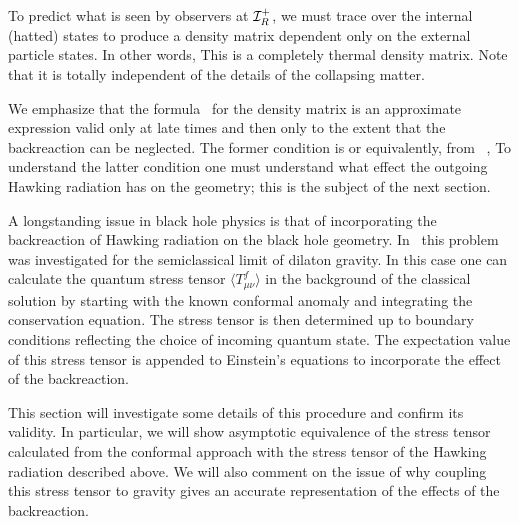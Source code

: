 To predict what is seen by observers at ${\cal I}_R^+$, we must trace over
the internal (hatted) states to produce a density matrix dependent only on
the external
particle states. In other words,
%
\eqn{}
%
This is a completely thermal density matrix.  Note that it is totally
independent of the details of the collapsing matter.

We emphasize that the formula \weig\ for the density matrix is an
approximate expression valid only at late times and then only to the extent
that the backreaction can be neglected.  The former condition is
%
\eqn{}
%
or equivalently, from \coordx\ ,
%
\eqn{}
%
To understand the latter condition one must understand what effect the
outgoing Hawking radiation has on the geometry; this is the subject of the
next section.


A longstanding issue in black hole physics is that of incorporating the
backreaction of Hawking radiation on the black hole geometry.  In \CGHS\
this problem was investigated for the semiclassical limit
of dilaton gravity.  In this case one can
calculate the quantum stress tensor $\langle T^{f}_{\mu\nu}\rangle$ in the
background of the
classical solution by starting with the known conformal anomaly and
integrating the conservation equation\refs{\CrFu}. The stress tensor is then
determined
up to boundary conditions
reflecting the choice of incoming quantum state. The expectation value of
this stress tensor is appended to Einstein's equations to incorporate
the effect of the backreaction.

This section will investigate some details of this procedure and confirm
its validity.  In particular, we will show asymptotic
equivalence of the stress tensor
calculated from the conformal approach with the stress tensor of the
Hawking radiation described above.  We will also comment on the issue of
why coupling this stress tensor to gravity gives an accurate representation
of the effects of the backreaction.

